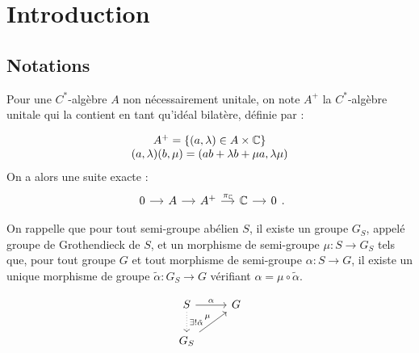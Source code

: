 \section{Introduction}
\subsection{Notations}

Pour une $C^*$-algèbre $A$ non nécessairement unitale, on note $A^+$ la $C^*$-algèbre unitale qui la contient en tant qu'idéal bilatère, définie par :

\[\begin{array}{c}A^+=\{(a,\lambda)\in A\times \mathbb C \} \\ (a,\lambda)(b,\mu)=(ab+\lambda b +\mu a,\lambda\mu)\end{array}\]
 On a alors une suite exacte :
\[\begin{tikzcd}[column sep = small] 0 \arrow{r} &  A \arrow{r} & A^+ \arrow{r}{\pi_\C} & \C \arrow{r} & 0 \end{tikzcd}.\]

On rappelle que pour tout semi-groupe abélien $S$, il existe un groupe $G_S$, appelé groupe de Grothendieck de $S$, et un morphisme de semi-groupe $\mu : S\rightarrow G_S$ tels que, pour tout groupe $G$ et tout morphisme de semi-groupe $\alpha : S\rightarrow G$, il existe un unique morphisme de groupe $\tilde \alpha : G_S \rightarrow G$ vérifiant $\alpha = \mu \circ \tilde\alpha$. 

\[\begin{tikzcd} S \arrow{r}{\alpha} \arrow[dotted]{d}{\exists !\tilde\alpha}& G \\
	G_S \arrow{ur}{\mu} & \end{tikzcd}\]
 
